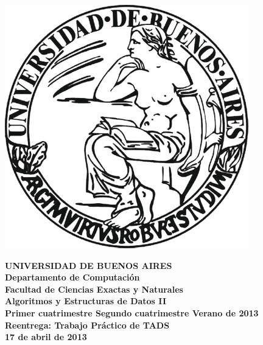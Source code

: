 
\def\Materia{Algoritmos y Estructuras de Datos II}
\def\cuatrimestre{1}
\def\elanio{2013}
\def\Titulo{\LARGE Reentrega: Trabajo Pr\'actico de TADS}
\def\Fecha{17 de abril de 2013}

\newcommand{\cuatrimestreLindo}{
  \ifthenelse{\equal{\cuatrimestre}{1}}
  {Primer cuatrimestre}
  {\ifthenelse{\equal{\cuatrimestre}{2}}
  {Segundo cuatrimestre}
  {Verano}}
}


\thispagestyle{empty}

\begin{center}
	\includegraphics[scale = 0.25]{imagenes/logo_uba.jpg}
\end{center}

\vspace{5mm}

\begin{center}
	{\textbf{\large UNIVERSIDAD DE BUENOS AIRES}}\\[1.5em]
	{\textbf{\large Departamento de Computaci\'{o}n}}\\[1.5em]
    {\textbf{\large Facultad de Ciencias Exactas y Naturales}}\\
    \vspace{20mm}
    {\LARGE\textbf{\Materia}}\\[1em]    
    \vspace{5mm}
    {\LARGE\textbf{\cuatrimestreLindo de \elanio}}\\
    \vspace{15mm}
    {\Large \textbf{\Titulo}}\\[1em]
    \vspace{15mm}
    {\textbf{\Large \Fecha}}\\
    \vspace{15mm}
    \textbf{\tablaints}
\end{center}

